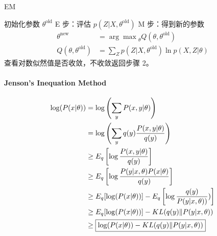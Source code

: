 	\begin{algorithm}[h]
		\caption{EM}
		初始化参数 $\theta^\text{old}$\;
		E 步：评估 $p(Z|X,\theta^\text{old})$\;
		M 步：得到新的参数
		\begin{align*}
			\theta^\text{new}&={\arg\max}_\theta Q(\theta,\theta^\text{old})\\
			Q(\theta,\theta^\text{old})&=\sum_{Z}p(Z|X,\theta^\text{old})\ln p(X,Z|\theta)
		\end{align*}
		查看对数似然值是否收敛，不收敛返回步骤 2。
	\end{algorithm}



\clearpage

	\paragraph{Jenson's Inequation Method}
	
	\begin{align*}
		\log(P(x|\theta)) &= \log\left(\sum_y P(x,y|\theta)\right) \\
		&=\log\left(\sum_y q(y) \frac{P(x,y|\theta)}{q(y)}\right)\\ 
		&\geq E_q\left[\log\frac{P(x,y|\theta)}{q(y)} \right]\\
		&\geq E_q\left[\log\frac{P(y|x,\theta)P(x|\theta)}{q(y)}\right]\\
		&\geq E_q[\log(P(x|\theta))] - E_q\left[\log\frac{q(y)}{P(y|x,\theta))})\right]\\
		&\geq E_q[\log(P(x|\theta))] - KL(q(y)\Vert P(y|x,\theta))\\
		&\geq \fbox{$\log(P(x|\theta)) - KL(q(y)\Vert P(y|x,\theta))$}
	\end{align*}


